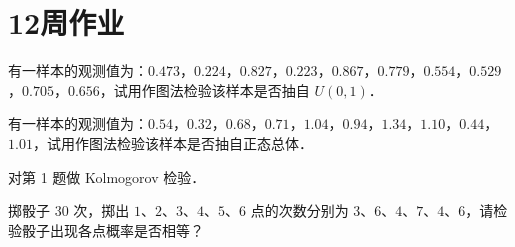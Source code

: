 \section{12周作业}
\begin{homework}[1]
有一样本的观测值为：$0.473$，$0.224$，$0.827$，$0.223$，$0.867$，$0.779$，$0.554$，$0.529$，$0.705$，$0.656$，试用作图法检验该样本是否抽自 $U(0,1)$．
\end{homework}

\begin{homework}[2]
有一样本的观测值为：$0.54$，$0.32$，$0.68$，$0.71$，$1.04$，$0.94$，$1.34$，$1.10$，$0.44$，$1.01$，试用作图法检验该样本是否抽自正态总体．
\end{homework}

\begin{homework}[extra]
对第 1 题做 Kolmogorov 检验．

掷骰子 $30$ 次，掷出 $1$、$2$、$3$、$4$、$5$、$6$ 点的次数分别为 $3$、$6$、$4$、$7$、$4$、$6$，请检验骰子出现各点概率是否相等？
\end{homework}